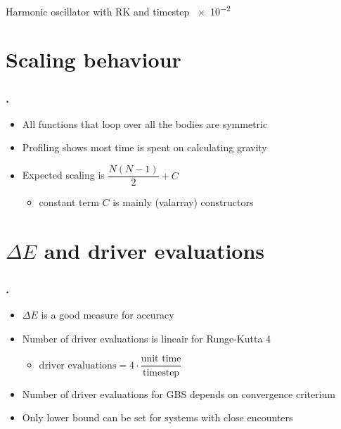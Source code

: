 \documentclass{beamer}
\begin{document}
\begin{frame}
\centering
Harmonic oscillator with RK and timestep \num{e-2}
\vspace{-1cm}
\begin{figure}
			
\end{figure}
\end{frame}

\section{Scaling behaviour}
\begin{frame}
\frametitle{\thesection. \insertsection}
\begin{itemize}
	\item All functions that loop over all the bodies are symmetric
	\item Profiling shows most time is spent on calculating gravity
	\item Expected scaling is $\dfrac{N(N-1)}{2} + C$
	\begin{itemize}
		\item constant term $C$ is mainly (valarray) constructors
	\end{itemize}
\end{itemize}	
\end{frame}

\begin{frame}
\centering
\begin{figure}
\centering
	
\end{figure}
\end{frame}

\section{\texorpdfstring{$\Delta E$ and driver evaluations}{Delta E and driver evaluations}}

\begin{frame}
\frametitle{\thesection. \insertsection}
\begin{itemize}
	\item $\Delta E$ is a good measure for accuracy
	\item Number of driver evaluations is lineair for Runge-Kutta 4
	\begin{itemize}
		\item $\text{driver evaluations} = 4\cdot\dfrac{\text{unit time}}{\text{timestep}}$
	\end{itemize}
	\item Number of driver evaluations for GBS depends on convergence criterium
	\item Only lower bound can be set for systems with close encounters
\end{itemize}	
\end{frame}
\end{document}
